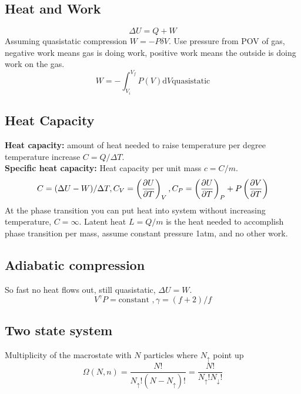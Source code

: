 \documentclass[a4paper, norsk, 8pt]{article}
\begin{document}
\begin{multicols*}{3}
\subsection*{\footnotesize  Heat and Work}
\begin{equation}
  \Delta U = Q + W
\end{equation}
Assuming quasistatic compression $W = -P\delta V$. Use pressure from POV of gas, negative work means gas is doing work, positive work means the outside is doing work on the gas.
\begin{equation*}
  W = -\int_{V_i}^{V_f}P(V) \mbox{d} V \text{quasistatic}
\end{equation*}

\subsection*{\footnotesize  Heat Capacity}
\textbf{Heat capacity:} amount of heat needed to raise temperature per degree temperature increase $C=Q/\Delta T$.\\
\textbf{Specific heat capacity:} Heat capacity per unit mass $c=C/m$.\\
\begin{equation*}
  C = (\Delta U - W)/\Delta T, C_V = \left(\pdv{U}{T}\right)_V, C_P = \left(\pdv{U}{T}\right)_P + P\left( \pdv{V}{T} \right)
\end{equation*}
At the phase transition you can put heat into system without increasing temperature, $C=\infty$. Latent heat $L=Q/m$ is the heat needed to accomplish phase transition per mass, assume constant pressure 1atm, and no other work.



\subsection*{\footnotesize  Adiabatic compression}
So fast no heat flows out, still quasistatic, $\Delta U = W$.
$$V^{\gamma}P = \text{constant }, \gamma = (f+2)/f$$

\subsection*{\footnotesize  Two state system}
Multiplicity of the macrostate with $N$ particles where $N_{\uparrow}$ point up
\begin{equation}
  \Omega(N, n) = \frac{N!}{N_{\uparrow}! (N-N_{\uparrow})!} =  \frac{N!}{N_{\uparrow}! N_{\downarrow}!}
\end{equation}


\end{multicols*}
\end{document}
